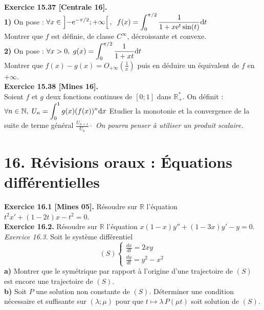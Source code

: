 \documentclass[a4paper,12pt,francais]{article}
\newcommand{\field}[1]{\mathbb{#1}}
\newcommand{\N}{\field{N}}
\newcommand{\R}{\field{R}}
\newcommand{\e}{\mbox{e}}
\begin{document}
\noindent  %
{\bf Exercice 15.37 [Centrale 16].}\\
{\bf 1)} On pose :
$\displaystyle \forall x \in \left] - \e^{-\pi/2}; +\infty \right[,\; \;
f(x)= \int_0^{\pi/2} \frac{1}{1+x \e^t \sin(t)} {\rm d}t
$\\
Montrer que $f$ est définie, de classe $C^\infty$, décroissante et convexe.\\
{\bf 2)} On pose : 
$\displaystyle \forall x>0, \; g(x)= \int_0^{\pi/2} \frac{1}{1+x t} {\rm d}t
$\\
Montrer que $\displaystyle f(x)-g(x)= O_{+\infty}\left( \frac{1}{x} \right)$ puis en déduire un équivalent de $f$ en $+\infty$.\\

\noindent  %
{\bf Exercice 15.38 [Mines 16].}\\
Soient $f$ et $g$ deux fonctions continues de $[0;1]$ dans $\R_+^*$.
On définit : 
$\displaystyle \forall n \in \N,\; U_n= \int_0^1 g(x) (f(x))^n {\rm d}x$
Etudier la monotonie et la convergence de la suite de terme général $\frac{U_{n+1}}{U_{n}} \cdot$
{\it On pourra penser à utiliser un produit scalaire.}\\

\newpage
\section*{16. Révisions oraux : \'Equations différentielles} %


\noindent
{\bf Exercice 16.1 [Mines 05].} Résoudre sur $\R$ l'équation $t^2
x'+(1-2t)x-t^2=0$.\\
 
\noindent
{\bf Exercice 16.2.} Résoudre sur $\R$ l'équation $x(1-x)y''+(1-3x)y'-y=0$.\\

\noindent
{\it Exercice 16.3.} Soit le système différentiel
$$(S) \left\{ {\begin{array}{l}
\displaystyle
\frac{dx}{dt} = 2 x y \\
\displaystyle 
\frac{dy}{dt}=y^2-x^2
\end{array} } \right.$$
\indent
{\bf a)} Montrer que le symétrique par rapport à l'origine d'une
trajectoire de $(S)$ est encore une trajectoire de $(S)$.\\
\indent
{\bf b)} Soit $P$ une solution non constante de $(S)$. Déterminer une condition
nécessaire et suffisante sur $(\lambda;\mu)$ pour que $t\mapsto
\lambda\, P(\mu t)$ soit solution de $(S)$.\\
\end{document}
